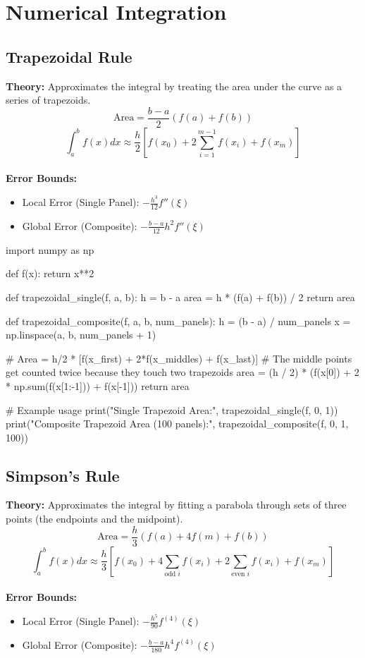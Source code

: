 \documentclass{article}
\begin{document}
\section{Numerical Integration}

\subsection{Trapezoidal Rule}
\textbf{Theory:} Approximates the integral by treating the area under the curve as a series of trapezoids.
$$ \text{Area} = \frac{b - a}{2} (f(a) + f(b)) $$
$$ \int_a^b f(x) dx \approx \frac{h}{2} \left[ f(x_0) + 2 \sum_{i=1}^{m-1} f(x_i) + f(x_m) \right] $$ \\
\textbf{Error Bounds:} 
\begin{itemize}
    \item Local Error (Single Panel): $-\frac{h^3}{12}f''(\xi)$
    \item Global Error (Composite): $-\frac{b-a}{12}h^2 f''(\xi)$
\end{itemize}

\begin{jupytercode}
import numpy as np

def f(x):
    return x**2

def trapezoidal_single(f, a, b):
    h = b - a
    area = h * (f(a) + f(b)) / 2
    return area

def trapezoidal_composite(f, a, b, num_panels):
    h = (b - a) / num_panels
    x = np.linspace(a, b, num_panels + 1)
    
    # Area = h/2 * [f(x_first) + 2*f(x_middles) + f(x_last)]
    # The middle points get counted twice because they touch two trapezoids
    area = (h / 2) * (f(x[0]) + 2 * np.sum(f(x[1:-1])) + f(x[-1]))
    return area

# Example usage
print("Single Trapezoid Area:", trapezoidal_single(f, 0, 1))
print("Composite Trapezoid Area (100 panels):", trapezoidal_composite(f, 0, 1, 100))
\end{jupytercode}
\newpage

\subsection{Simpson's Rule}
\textbf{Theory:} Approximates the integral by fitting a parabola through sets of three points (the endpoints and the midpoint).
$$ \text{Area} = \frac{h}{3} (f(a) + 4f(m) + f(b)) $$
$$ \int_a^b f(x) dx \approx \frac{h}{3} \left[ f(x_0) + 4 \sum_{\text{odd } i} f(x_i) + 2 \sum_{\text{even } i} f(x_i) + f(x_m) \right] $$ \\
\textbf{Error Bounds:} 
\begin{itemize}
    \item Local Error (Single Panel): $-\frac{h^5}{90}f^{(4)}(\xi)$
    \item Global Error (Composite): $-\frac{b-a}{180}h^4 f^{(4)}(\xi)$
\end{itemize}
\end{document}
